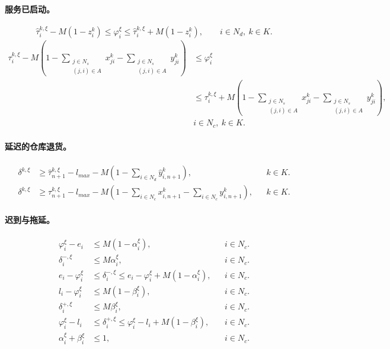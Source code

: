\documentclass[10pt]{article}
\begin{document}
\paragraph{服务已启动。}
\begin{equation}
\hat\tau_i^{k,\xi}-M(1-z_i^k)\leq\varphi_i^\xi\leq\hat\tau_i^{k,\xi}+M(1-z_i^k),
\qquad i\in N_d,\ k\in K.\tag{17a}
\end{equation}
\begin{equation}
\begin{aligned}
\tau_i^{k,\xi}-M\left(1-\sum_{\substack{j\in N_s\\(j,i)\in A}}x_{ji}^k-\sum_{\substack{j\in N_s\\(j,i)\in A}}y_{ji}^k\right)
&\leq\varphi_i^\xi\\
&\leq\tau_i^{k,\xi}+M\left(1-\sum_{\substack{j\in N_s\\(j,i)\in A}}x_{ji}^k-\sum_{\substack{j\in N_s\\(j,i)\in A}}y_{ji}^k\right),\\
&i\in N_c,\ k\in K.
\end{aligned}\tag{17b}
\end{equation}

\paragraph{延迟的仓库退货。}
\begin{align}
\delta^{k,\xi}&\geq\hat\tau_{n+1}^{k,\xi}-l_{max}-M\left(1-\sum_{i\in N_d}\hat y_{i,n+1}^k\right),
&&k\in K.\tag{18a}\\
\delta^{k,\xi}&\geq\tau_{n+1}^{k,\xi}-l_{max}-M\left(1-\sum_{i\in N_c}x_{i,n+1}^k-\sum_{i\in N_c}y_{i,n+1}^k\right),
&&k\in K.\tag{18b}
\end{align}

\paragraph{迟到与拖延。}
\begin{align}
\varphi_i^\xi-e_i&\leq M(1-\alpha_i^\xi),&&i\in N_c.\tag{19a}\\
\delta_i^{-,\xi}&\leq M\alpha_i^\xi,&&i\in N_c.\tag{19b}\\
e_i-\varphi_i^\xi&\leq\delta_i^{-,\xi}\leq e_i-\varphi_i^\xi+M(1-\alpha_i^\xi),&&i\in N_c.\tag{19c}\\
l_i-\varphi_i^\xi&\leq M(1-\beta_i^\xi),&&i\in N_c.\tag{19d}\\
\delta_i^{+,\xi}&\leq M\beta_i^\xi,&&i\in N_c.\tag{19e}\\
\varphi_i^\xi-l_i&\leq\delta_i^{+,\xi}\leq\varphi_i^\xi-l_i+M(1-\beta_i^\xi),&&i\in N_c.\tag{19f}\\
\alpha_i^\xi+\beta_i^\xi&\leq1,&&i\in N_c.\tag{19g}
\end{align}
\end{document}
